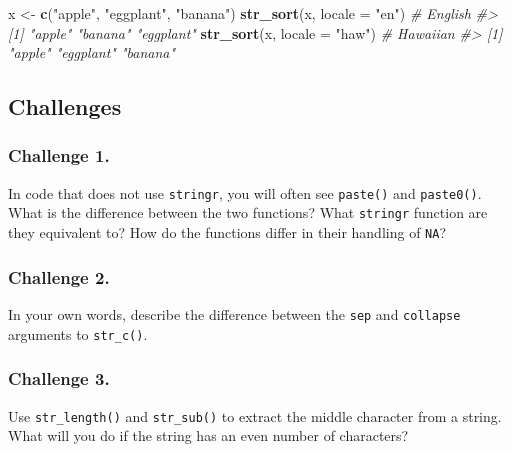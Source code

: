 \documentclass[
]{book}
\newenvironment{Shaded}{\begin{snugshade}}{\end{snugshade}}
\newcommand{\CommentTok}[1]{\textcolor[rgb]{0.56,0.35,0.01}{\textit{#1}}}
\newcommand{\DataTypeTok}[1]{\textcolor[rgb]{0.13,0.29,0.53}{#1}}
\newcommand{\KeywordTok}[1]{\textcolor[rgb]{0.13,0.29,0.53}{\textbf{#1}}}
\newcommand{\NormalTok}[1]{#1}
\newcommand{\StringTok}[1]{\textcolor[rgb]{0.31,0.60,0.02}{#1}}
\begin{document}
\begin{Shaded}
\begin{Highlighting}[]
\NormalTok{x <-}\StringTok{ }\KeywordTok{c}\NormalTok{(}\StringTok{"apple"}\NormalTok{, }\StringTok{"eggplant"}\NormalTok{, }\StringTok{"banana"}\NormalTok{)}
\KeywordTok{str_sort}\NormalTok{(x, }\DataTypeTok{locale =} \StringTok{"en"}\NormalTok{)  }\CommentTok{# English}
\CommentTok{#> [1] "apple"    "banana"   "eggplant"}
\KeywordTok{str_sort}\NormalTok{(x, }\DataTypeTok{locale =} \StringTok{"haw"}\NormalTok{) }\CommentTok{# Hawaiian}
\CommentTok{#> [1] "apple"    "eggplant" "banana"}
\end{Highlighting}
\end{Shaded}

\hypertarget{challenges-15}{%
\subsection{Challenges}\label{challenges-15}}

\hypertarget{challenge-1.-12}{%
\subsubsection*{Challenge 1.}\label{challenge-1.-12}}

In code that does not use \texttt{stringr}, you will often see \texttt{paste()} and \texttt{paste0()}. What is the difference between the two functions? What \texttt{stringr} function are they equivalent to? How do the functions differ in their handling of \texttt{NA}?

\hypertarget{challenge-2.-11}{%
\subsubsection*{Challenge 2.}\label{challenge-2.-11}}

In your own words, describe the difference between the \texttt{sep} and \texttt{collapse} arguments to \texttt{str\_c()}.

\hypertarget{challenge-3.-7}{%
\subsubsection*{Challenge 3.}\label{challenge-3.-7}}

Use \texttt{str\_length()} and \texttt{str\_sub()} to extract the middle character from
a string. What will you do if the string has an even number of characters?
\end{document}
